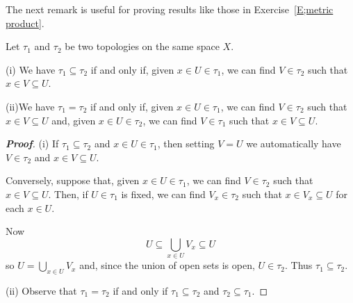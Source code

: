 The next remark is useful for proving results like those in Exercise~\ref{E;metric product}.



\begin{theorem}\label{L;same topology}
Let $\tau_{1}$ and $\tau_{2}$ be two topologies on the same space $X$. 

(i) We have $\tau_{1}\subseteq\tau_{2}$ if and only if, given $x\in U\in\tau_{1}$, we can find $V\in\tau_{2}$ such that $x\in V\subseteq U$.

(ii)We have $\tau_{1}=\tau_{2}$ if and only if, given $x\in U\in\tau_{1}$, we can find $V\in\tau_{2}$ such that $x\in V\subseteq U$ and, given $x\in U\in\tau_{2}$, we can find $V\in\tau_{1}$ such that $x\in V\subseteq U$.
\end{theorem}

\begin{proof}[\bf Proof] (i) If $\tau_{1}\subseteq\tau_{2}$
and $x\in U\in\tau_{1}$, then setting $V=U$ we
automatically
have $V\in\tau_{2}$ and $x\in V\subseteq U$.

Conversely, suppose that,
given $x\in U\in\tau_{1}$, we can find
$V\in\tau_{2}$ such that $x\in V\subseteq U$.
Then, if $U\in\tau_{1}$ is fixed, we can find
$V_{x}\in\tau_{2}$ such that $x\in V_{x}\subseteq U$
for each $x\in U$.

Now
\[
U\subseteq \bigcup_{x\in U}V_{x}\subseteq U
\]
so $U=\bigcup_{x\in U}V_{x}$ and, since the union of open sets is open, $U\in\tau_{2}$. Thus $\tau_{1}\subseteq \tau_{2}$.

(ii) Observe that $\tau_{1}=\tau_{2}$ if and only if $\tau_{1}\subseteq\tau_{2}$ and $\tau_{2}\subseteq\tau_{1}$.
\end{proof}



